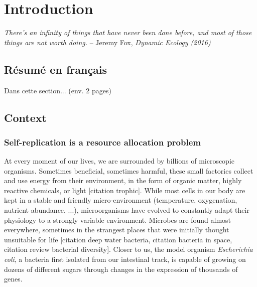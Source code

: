 \chapter{Introduction}

\textit{There's an infinity of things that have never been done before, and most of those things are not worth doing.} -- Jeremy Fox, \textit{Dynamic Ecology (2016)}~\cite{fox_how_2016}

\section*{Résumé en français}

Dans cette section... (env. 2 pages)

\section{Context}
\label{sec:context}

\subsection{Self-replication is a resource allocation problem}

At every moment of our lives, we are surrounded by billions of microscopic organisms.
Sometimes beneficial, sometimes harmful, these small factories collect and use energy from their environment, in the form of organic matter, highly reactive chemicals, or light [citation trophic].
While most cells in our body are kept in a stable and friendly micro-environment (temperature, oxygenation, nutrient abundance, ...), microorganisms have evolved to constantly adapt their physiology to a strongly variable environment.
Microbes are found almost everywhere, sometimes in the strangest places that were initially thought unsuitable for life [citation deep water bacteria, citation bacteria in space, citation review bacterial diversity].
Closer to us, the model organism \textit{Escherichia coli}, a bacteria first isolated from our intestinal track, is capable of growing on dozens of different sugars through changes in the expression of thousands of genes\cite{zimmer_microcosm:_2009}.

